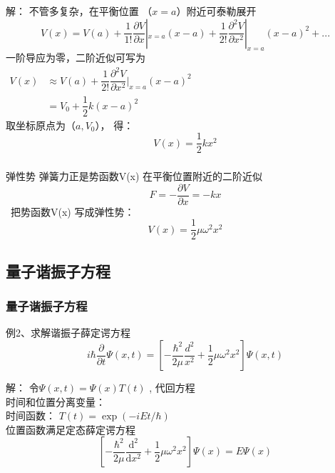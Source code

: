 \begin{frame}
	\frametitle{}
	\alert{解：} 	不管多复杂，在平衡位置 （$x=a$）附近可泰勒展开
	\begin{equation*}
		V(x)=V(a) +\frac{1}{1!} \frac{\partial V}{\partial x} |_{x=a} (x-a) +\frac{1}{2!} \frac{\partial ^2 V}{\partial x ^2} |_{x=a} (x-a) ^2 + ... 
	\end{equation*}
	一阶导应为零，二阶近似可写为 \\
	$\displaystyle  \begin{array}{lllllllll}
		V(x) &\approx V(a)+\dfrac{1}{2!} \dfrac{\partial ^2 V}{\partial x ^2} |_{x=a} (x-a) ^2   \\
		& =V_0+\dfrac{1}{2} k (x-a) ^2 
	\end{array}$\\
	取坐标原点为（$a, V_0 $）， 得：\\
	\begin{equation*}
		V(x)=\dfrac{1}{2} k x^2 
	\end{equation*}	
\end{frame}

\begin{frame}
	\frametitle{}
	\begin{block}{弹性势}
		弹簧力正是势函数V(x) 在平衡位置附近的二阶近似\\
		\begin{equation*}
			F=-\frac{ \partial V}{\partial x}=-kx 
		\end{equation*}	
		 把势函数V(x) 写成弹性势：\\
		\begin{equation*}
			V(x)=\dfrac{1}{2} \mu \omega ^2 x^2 
		\end{equation*}
	\end{block}	
\end{frame}	

\subsection{量子谐振子方程}

\begin{frame}
	\frametitle{量子谐振子方程}
	\begin{exampleblock} {例2、求解谐振子薛定谔方程}
	\begin{equation*}
		i\hbar \frac{\partial }{\partial t} \Psi (x,t ) =[ -\frac{\hbar^2}{2\mu } \frac{d ^2}{x^2} + \frac{1}{2} \mu \omega ^2 x^2   ] \Psi (x, t ) 
	\end{equation*}
	\end{exampleblock}
	\alert{解：} 	令$\Psi (x,t) =\Psi(x) T(t) $ ,  代回方程\\
	时间和位置分离变量：\\
	时间函数： $T(t)  = \exp(-i E t /\hbar) $ \\
	位置函数满足定态薛定谔方程\\
	\begin{equation*}
		\left [ -\frac{\hbar^2}{2\mu} \frac{\mathrm{d} ^2}{\mathrm{d} x^2} +\frac{1}{2}\mu \omega^2 x^2  \right ]\Psi(x)=E\Psi(x) 
	\end{equation*}	
\end{frame}

